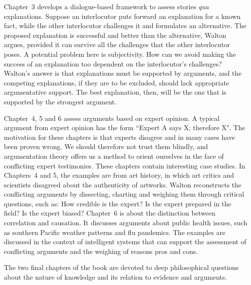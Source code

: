 \documentclass[12pt]{article}
\begin{document}
Chapter~3 develops a dialogue-based framework to assess stories \textit{qua}
explanations. Suppose an interlocutor puts forward an explanation for
a known fact, while the other interlocutor challenges it and
formulates an alternative. The proposed explanation is successful and
better than the alternative, Walton argues, provided it can survive all
the challenges that the other interlocutor poses. A potential problem here is subjectivity. How can we avoid
making the success of an explanation too dependent on the interlocutor's challenges? Walton's answer is that explanations must be supported
by arguments, %
and the competing explanations, if they are to
be excluded, should lack appropriate argumentative support. 
The best explanation, then, will be the one that is 
supported by the strongest argument.

Chapter~4, 5 and 6 
assess arguments based on expert opinion.
A typical argument from
expert opinion has the form ``Expert A says X; therefore X". The motivation for these chapters is that experts
disagree and in many cases have been proven wrong. We should therefore not
trust them blindly, and argumentation theory offers us a method to
orient ourselves in the face of conflicting expert testimonies. These chapters contain 
interesting case studies. In Chapters~4 and 5, the examples are 
from art history, in which art critics and scientists disagreed about
the authenticity of artworks. Walton reconstructs the conflicting
arguments by dissecting, charting and weighing them through critical
questions, such as: How credible is the expert? Is the expert prepared
in the field? Is the expert biased? Chapter~6 is about the distinction between correlation and causation. 
It discusses arguments about public health issues, such as southern Pacific weather patterns and flu pandemics. The examples are discussed in the context of 
intelligent systems that can support the assessment of
conflicting arguments and the weighing of reasons pros and cons.

The two final chapters of the book are devoted to deep philosophical
questions about the nature of knowledge and its relation to evidence and arguments.
\end{document}
